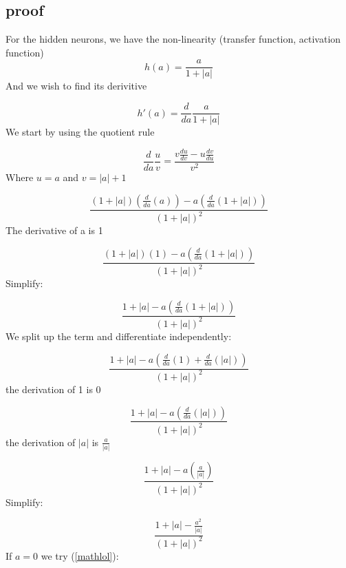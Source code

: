 \subsection{proof}

For the hidden neurons, we have the non-linearity (transfer function, activation function)
\begin{equation} \label{eq:transformation}
    h(a) = \frac{a}{1 + |a|}
\end{equation}
And we wish to find its derivitive 

\begin{equation*}
    h'(a) = \frac{d}{da}\frac{a}{1 + |a|}
\end{equation*}
We start by using the quotient rule 

\begin{equation*}
    \frac{d}{da} \frac{u}{v} = \frac{v \frac{du}{dv} - u\frac{dv}{du}}{v^2}
\end{equation*}
Where $u = a$ and $v = |a| + 1$

\begin{equation*}
    \frac{(1 + |a|) (\frac{d}{da}(a)) - a(\frac{d}{da}(1 + |a|))}{(1 + |a|)^2}
\end{equation*}
The derivative of a is 1

\begin{equation*}
    \frac{(1 + |a|)(1) - a(\frac{d}{da}(1 + |a|))}{(1 + |a|)^2}
\end{equation*}
Simplify:

\begin{equation*}
    \frac{1 + |a| - a(\frac{d}{da}(1 + |a|))}{(1 + |a|)^2}
\end{equation*}
We split up the term and differentiate independently:

\begin{equation*}
    \frac{1 + |a| - a(\frac{d}{da}(1) + \frac{d}{da}(|a|))}{(1 + |a|)^2}
\end{equation*}
the derivation of 1 is 0

\begin{equation*}
    \frac{1 + |a| - a(\frac{d}{da}(|a|))}{(1 + |a|)^2}
\end{equation*}
the derivation of $|a|$ is $\frac{a}{|a|}$

\begin{equation*}
    \frac{1 + |a| - a(\frac{a}{|a|})}{(1 + |a|)^2}
\end{equation*}
Simplify:

\begin{equation} \label{mathlol}
    \frac{1 + |a| - \frac{a^2}{|a|}}{(1 + |a|)^2}
\end{equation}
If $a = 0$ we try (\ref{mathlol}):

